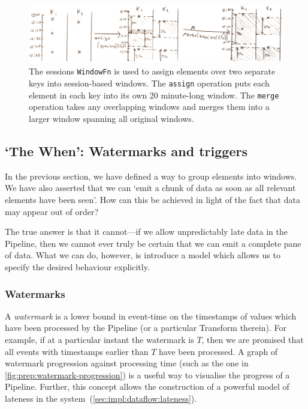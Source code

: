 \begin{figure}[h]
	\includegraphics[width=\textwidth]{images/temp/sessions-assign-merge}
	\caption[A \texttt{WindowFn} is used to place elements into session-based, unaligned windows.]
	{The sessions \texttt{WindowFn} is used to assign elements over two separate keys into session-based windows. The \texttt{assign} operation puts each element in each key into its own 20 minute-long window. The \texttt{merge} operation takes any overlapping windows and merges them into a larger window spanning all original windows.}
	\label{fig:prep:sessions-merge}
\end{figure}


\subsection{`The When': Watermarks and triggers}\label{sec:prep:dataflow:when}

In the previous section, we have defined a way to group elements into windows.
We have also asserted that we can `emit a chunk of data as soon as all relevant elements have been seen'.
How can this be achieved in light of the fact that data may appear out of order?

The true answer is that it cannot---if we allow unpredictably late data in the Pipeline, then we cannot ever truly be certain that we can emit a complete pane of data.
What we can do, however, is introduce a model which allows us to specify the desired behaviour explicitly.

\subsubsection{Watermarks}


A \emph{watermark} is a lower bound in event-time on the timestamps of values which have been processed by the Pipeline (or a particular Transform therein).
For example, if at a particular instant the watermark is $T$, then we are promised that all events with timestamps earlier than $T$ have been processed.
A graph of watermark progression against processing time (such as the one in \cref{fig:prep:watermark-progression}) is a useful way to visualise the progress of a Pipeline.
Further, this concept allows the construction of a powerful model of lateness in the system~(\cref{sec:impl:dataflow:lateness}).

